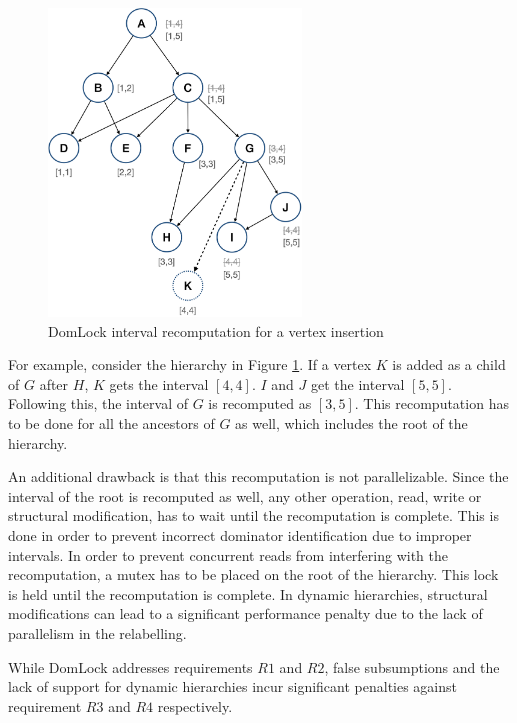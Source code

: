 \begin{figure}[h]
    \centering
    \captionsetup{justification=centering}
    \includegraphics[width=0.6\textwidth]{figures/domlock_example_with_SM.png}
    \caption{DomLock interval recomputation for a vertex insertion}
    \label{fig:domlock_example_SM}
\end{figure}

For example, consider the hierarchy in Figure \ref{fig:domlock_example_SM}. If a vertex $K$ is added as a child of $G$ after $H$, $K$ gets the interval $[4,4]$. $I$ and $J$ get the interval $[5,5]$. Following this, the interval of $G$ is recomputed as $[3,5]$. This recomputation has to be done for all the ancestors of $G$ as well, which includes the root of the hierarchy. 

An additional drawback is that this recomputation is not parallelizable. Since the interval of the root is recomputed as well, any other operation, read, write or structural modification, has to wait until the recomputation is complete. 
This is done in order to prevent incorrect dominator identification due to improper intervals.
In order to prevent concurrent reads from interfering with the recomputation, a mutex has to be placed on the root of the hierarchy. This lock is held until the recomputation is complete. 
In dynamic hierarchies, structural modifications can lead to a significant performance penalty due to the lack of parallelism in the relabelling. 

While DomLock addresses requirements $R1$ and $R2$, false subsumptions and the lack of support for dynamic hierarchies incur significant penalties against requirement $R3$ and $R4$ respectively.



